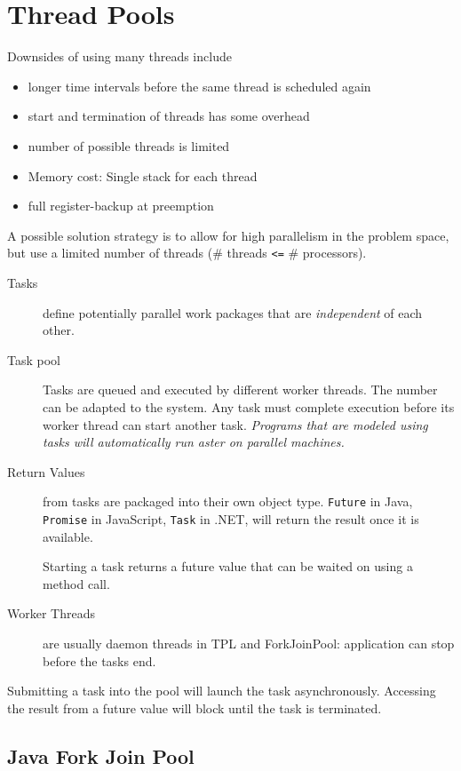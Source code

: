 \section{Thread Pools}

Downsides of using many threads include
\begin{itemize}
    \item longer time intervals before the same thread is scheduled again
    \item start and termination of threads has some overhead
    \item number of possible threads is limited
    \item Memory cost: Single stack for each thread
    \item full register-backup at preemption
\end{itemize}

A possible solution strategy is to allow for high parallelism in the problem space, but use a limited number of threads (\# threads \texttt{<=} \# processors).

\begin{description}
  \item[Tasks] define potentially parallel work packages that are \textit{independent} of each other.  
  \item[Task pool] Tasks are queued and executed by different worker threads. The number can be adapted to the system. Any task must complete execution before its worker thread can start another task.
  \textit{Programs that are modeled using tasks will automatically run aster on parallel machines.}
  \item[Return Values] from tasks are packaged into their own object type. \texttt{Future} in Java, \texttt{Promise} in JavaScript, \texttt{Task} in .NET, will return the result once it is available.
  
  Starting a task returns a future value that can be waited on using a method call.
  \item[Worker Threads] are usually daemon threads in TPL and ForkJoinPool: application can stop before the tasks end.
\end{description}

Submitting a task into the pool will launch the task asynchronously. Accessing the result from a future value will block until the task is terminated.

\subsection{Java Fork Join Pool}

